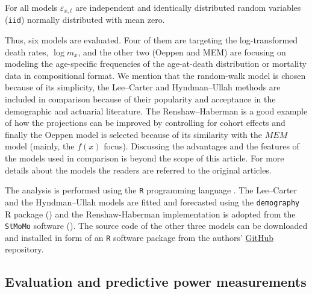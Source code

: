 \documentclass[T0_MEM]{subfiles}
\begin{document}
\begin{itemize}
For all models $\varepsilon_{x,t}$ are independent and identically distributed random variables (\texttt{iid}) normally distributed with mean zero.

\end{itemize}

Thus, six models are evaluated. Four of them are targeting the log-transformed death rates, $\log m_x$, and the other two (Oeppen and MEM) are focusing on modeling the age-specific frequencies of the age-at-death distribution or mortality data in compositional format. We mention that the random-walk model is chosen because of its simplicity, the Lee--Carter and Hyndman--Ullah methods are included in comparison because of their popularity and acceptance in the demographic and actuarial literature. The Renshaw--Haberman is a good example of how the projections can be improved by controlling for cohort effects and finally the Oeppen model is selected because of its similarity with the $MEM$ model (mainly, the $f(x)$ focus). Discussing the advantages and the features of the models used in comparison is beyond the scope of this article. For more details about the models the readers are referred to the original articles.

The analysis is performed using the \texttt{R} programming language \citep{team2018r}. The Lee--Carter and the Hyndman--Ullah models are fitted and forecasted using the \texttt{demography} R package (\citeyear{demography2017}) and the Renshaw-Haberman implementation is adopted from the \texttt{StMoMo} software (\citeyear{villegas2015}). The source code of the other three models can be downloaded and installed in form of an \texttt{R} software package from the authors' \href{https://github.com/mpascariu}{GitHub} repository.

\subsection{Evaluation and predictive power measurements}
\end{document}
